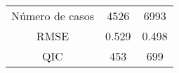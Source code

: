 \begin{table}[H]
{\begin{tabular}{@{}ccc@{}}
{\color[HTML]{000000} Número de casos}             & {\color[HTML]{000000} 4526}                                         & {\color[HTML]{000000} 6993}                                         \\
{\color[HTML]{000000} RMSE}                        & {\color[HTML]{000000} 0.529}                                        & {\color[HTML]{000000} 0.498}                                        \\
{\color[HTML]{000000} QIC}                         & {\color[HTML]{000000} 453}                                          & {\color[HTML]{000000} 699}                                          \\ \bottomrule
\end{tabular}%
}
\end{table}